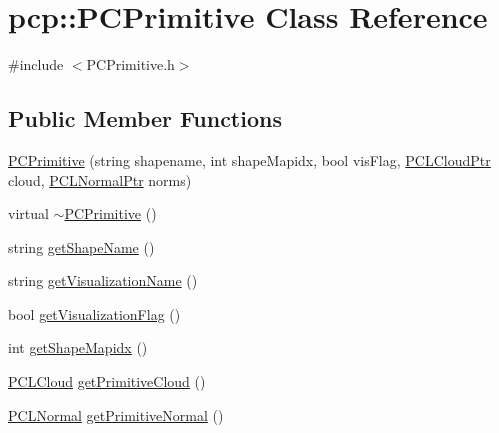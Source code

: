 \hypertarget{classpcp_1_1PCPrimitive}{\section{pcp\-:\-:P\-C\-Primitive Class Reference}
\label{classpcp_1_1PCPrimitive}
}


{\ttfamily \#include $<$P\-C\-Primitive.\-h$>$}

\subsection*{Public Member Functions}
\begin{DoxyCompactItemize}
\item 
\hyperlink{classpcp_1_1PCPrimitive_a00c270f938ac1f76c1252422e1f1424f}{P\-C\-Primitive} (string shapename, int shape\-Mapidx, bool vis\-Flag, \hyperlink{PCPrimitive_8h_aa14a240c8d999c4f56133c0f70e88783}{P\-C\-L\-Cloud\-Ptr} cloud, \hyperlink{PCPrimitive_8h_a1bc38ce8b0c26e5f2d28fae9f3e3ea97}{P\-C\-L\-Normal\-Ptr} norms)
\item 
virtual \hyperlink{classpcp_1_1PCPrimitive_a3a4da7e50a67144bc1b5b4dfd376b72e}{$\sim$\-P\-C\-Primitive} ()
\item 
string \hyperlink{classpcp_1_1PCPrimitive_a9f507218fd4c442d0daa4938e2e71c10}{get\-Shape\-Name} ()
\item 
string \hyperlink{classpcp_1_1PCPrimitive_ae6a97bc88b8cc7e83476413c73e01aeb}{get\-Visualization\-Name} ()
\item 
bool \hyperlink{classpcp_1_1PCPrimitive_ad92a83f976c6aac8125c7c8997633f21}{get\-Visualization\-Flag} ()
\item 
int \hyperlink{classpcp_1_1PCPrimitive_a1251deb8c39370d0ed5e7d2c7290063f}{get\-Shape\-Mapidx} ()
\item 
\hyperlink{PCPrimitive_8h_a02a7c0cdfcd324f1b5b87ce549fdbe10}{P\-C\-L\-Cloud} \hyperlink{classpcp_1_1PCPrimitive_ac774df2f9bb393e9a1491da1b0131d4f}{get\-Primitive\-Cloud} ()
\item 
\hyperlink{PCPrimitive_8h_abe81b5e6ffcc0ceb1b95b0489419027d}{P\-C\-L\-Normal} \hyperlink{classpcp_1_1PCPrimitive_aafdd30869b5e09e394d70efebe5eac2a}{get\-Primitive\-Normal} ()
\end{DoxyCompactItemize}
